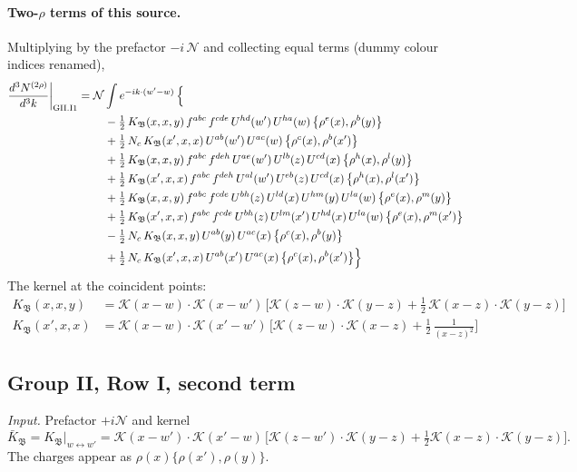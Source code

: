 \documentclass[10pt]{article}
\numberwithin{equation}{section}
\newcommand{\KK}{\mathcal K}
\newcommand{\NN}{\mathcal N}
\begin{document}
\paragraph{Two-$\rho$ terms of this source.} Multiplying by the prefactor $-i\,\NN$ and collecting equal terms (dummy colour indices renamed),
\begin{align}
\frac{d^3N^{(2\rho)}}{d^3k}\bigg|_{\rm GII.I1}={}&\NN\int e^{-ik\cdot(w'-w)}\,\Big\{\notag\\
&\quad -\tfrac12\,K_{\mathfrak B}(x,x,y)\,f^{abc}\,f^{cde}\,U^{hd}(w')\,U^{ha}(w)\,\big\{\rho^{e}(x),\rho^{b}(y)\big\}\notag\\
&\quad +\tfrac12\,N_{c}\,K_{\mathfrak B}(x',x,x)\,U^{ab}(w')\,U^{ac}(w)\,\big\{\rho^{c}(x),\rho^{b}(x')\big\}\notag\\
&\quad +\tfrac12\,K_{\mathfrak B}(x,x,y)\,f^{abc}\,f^{deh}\,U^{ae}(w')\,U^{lb}(z)\,U^{cd}(x)\,\big\{\rho^{h}(x),\rho^{l}(y)\big\}\notag\\
&\quad +\tfrac12\,K_{\mathfrak B}(x',x,x)\,f^{abc}\,f^{deh}\,U^{al}(w')\,U^{eb}(z)\,U^{cd}(x)\,\big\{\rho^{h}(x),\rho^{l}(x')\big\}\notag\\
&\quad +\tfrac12\,K_{\mathfrak B}(x,x,y)\,f^{abc}\,f^{cde}\,U^{bh}(z)\,U^{ld}(x)\,U^{hm}(y)\,U^{la}(w)\,\big\{\rho^{e}(x),\rho^{m}(y)\big\}\notag\\
&\quad +\tfrac12\,K_{\mathfrak B}(x',x,x)\,f^{abc}\,f^{cde}\,U^{bh}(z)\,U^{lm}(x')\,U^{hd}(x)\,U^{la}(w)\,\big\{\rho^{e}(x),\rho^{m}(x')\big\}\notag\\
&\quad -\tfrac12\,N_{c}\,K_{\mathfrak B}(x,x,y)\,U^{ab}(y)\,U^{ac}(x)\,\big\{\rho^{c}(x),\rho^{b}(y)\big\}\notag\\
&\quad +\tfrac12\,N_{c}\,K_{\mathfrak B}(x',x,x)\,U^{ab}(x')\,U^{ac}(x)\,\big\{\rho^{c}(x),\rho^{b}(x')\big\}\Big\}\label{R:eq:res-GII.I1}
\end{align}
The kernel at the coincident points:
\begin{align*}
K_{\mathfrak B}(x,x,y)&=\KK(x-w)\cdot\KK(x-w')\,\Big[\KK(z-w)\cdot\KK(y-z)+\tfrac12\,\KK(x-z)\cdot\KK(y-z)\Big]\\K_{\mathfrak B}(x',x,x)&=\KK(x-w)\cdot\KK(x'-w')\,\Big[\KK(z-w)\cdot\KK(x-z)+\tfrac12\,\frac{1}{(x-z)^2}\Big]
\end{align*}
\subsection{Group II, Row I, second term}\label{R:sec:GII.I2}
\emph{Input.} Prefactor $+i\NN$ and kernel
\begin{equation*}
\bar K_{\mathfrak B}=K_{\mathfrak B}\big|_{w\leftrightarrow w'}=\KK(x-w')\cdot\KK(x'-w)\,\big[\KK(z-w')\cdot\KK(y-z)+\tfrac12\KK(x-z)\cdot\KK(y-z)\big].
\end{equation*}
The charges appear as $\rho(x)\{\rho(x'),\rho(y)\}$.
\end{document}

